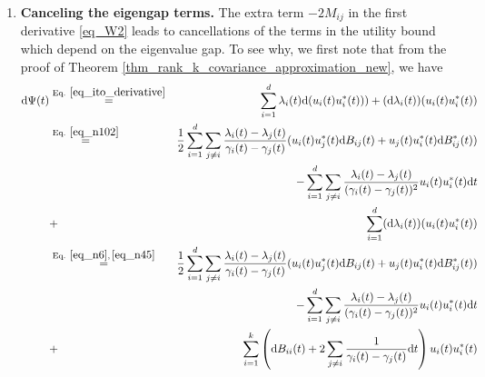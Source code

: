 \documentclass[11pt,letterpaper]{article}
\begin{document}
\begin{enumerate}
\item {\bf Canceling the eigengap terms.}
The extra term $-2M_{ij}$ in the first derivative \eqref{eq_W2} leads to cancellations of the terms in the utility bound which depend on the eigenvalue gap.
%
%
%
 To see why, we first note that from the proof of Theorem \ref{thm_rank_k_covariance_approximation_new}, we have
   \begin{eqnarray} 
  \mathrm{d} \Psi(t) &\stackrel{\textrm{Eq. } \eqref{eq_ito_derivative}}{=}& \sum_{i=1}^d \lambda_i(t) \mathrm{d}(u_i(t) u_i^\ast(t))) + (\mathrm{d}\lambda_i(t)) (u_i(t) u_i^\ast(t)) \nonumber\\
   &\stackrel{\textrm{Eq. } \eqref{eq_n102}}{=}&  \frac{1}{2} \sum_{i=1}^d     \sum_{j \neq i} \frac{\lambda_i(t)- \lambda_j(t)}{\gamma_i(t) - \gamma_j(t)}(u_i(t) u_j^\ast(t)\mathrm{d}B_{ij}(t) + u_j(t) u_i^\ast(t)\mathrm{d}B_{ij}^\ast(t)) \nonumber\\
& & \qquad \qquad  - \sum_{i=1}^d   \sum_{j\neq i} \frac{ \lambda_i(t) - \lambda_j(t) }{(\gamma_i(t)- \gamma_j(t))^2} u_i(t) u_i^\ast(t) \mathrm{d}t \nonumber\\
%
&+&  \sum_{i=1}^d  (\mathrm{d}\lambda_i(t)) (u_i(t) u_i^\ast(t)) \nonumber\\
%
   &\stackrel{\textrm{Eq. } \eqref{eq_n6}, \, \eqref{eq_n45}}{=}&  \frac{1}{2} \sum_{i=1}^d     \sum_{j \neq i} \frac{\lambda_i(t)- \lambda_j(t)}{\gamma_i(t) - \gamma_j(t)}(u_i(t) u_j^\ast(t)\mathrm{d}B_{ij}(t) + u_j(t) u_i^\ast(t)\mathrm{d}B_{ij}^\ast(t)) \nonumber\\
& & \qquad \qquad  - \sum_{i=1}^d   \sum_{j\neq i} \frac{ \lambda_i(t) - \lambda_j(t) }{(\gamma_i(t)- \gamma_j(t))^2} u_i(t) u_i^\ast(t) \mathrm{d}t \nonumber\\
%
&+&     \sum_{i=1}^k \left(\mathrm{d}B_{i i}(t) +  2 \sum_{j \neq i} \frac{1}{\gamma_i(t) - \gamma_j(t)} \mathrm{d}t \right) u_i(t) u_i^\ast(t) \label{eq_n106}
  \end{eqnarray}
  

\end{enumerate}
\end{document}
